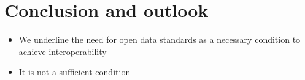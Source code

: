 \documentclass[
  authoryear]{elsarticle}
\providecommand{\tightlist}{%
  \setlength{\itemsep}{0pt}\setlength{\parskip}{0pt}}\usepackage{longtable,booktabs,array}
\begin{document}
\section{Conclusion and outlook}\label{conclusion-and-outlook}

\begin{itemize}
\tightlist
\item
  We underline the need for open data standards as a necessary condition
  to achieve interoperability
\item
  It is not a sufficient condition
\end{itemize}


  
\end{document}
